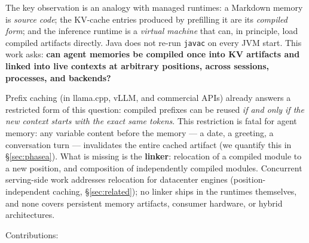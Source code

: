 \documentclass[11pt]{article}
\newcommand{\code}[1]{\texttt{#1}}
\begin{document}
The key observation is an analogy with managed runtimes: a Markdown memory is \emph{source code}; the KV-cache entries produced by prefilling it are its \emph{compiled form}; and the inference runtime is a \emph{virtual machine} that can, in principle, load compiled artifacts directly. Java does not re-run \code{javac} on every JVM start. This work asks: \textbf{can agent memories be compiled once into KV artifacts and linked into live contexts at arbitrary positions, across sessions, processes, and backends?}

Prefix caching (in llama.cpp, vLLM, and commercial APIs) already answers a restricted form of this question: compiled prefixes can be reused \emph{if and only if the new context starts with the exact same tokens}. This restriction is fatal for agent memory: any variable content before the memory --- a date, a greeting, a conversation turn --- invalidates the entire cached artifact (we quantify this in \S\ref{sec:phasea}). What is missing is the \textbf{linker}: relocation of a compiled module to a new position, and composition of independently compiled modules. Concurrent serving-side work addresses relocation for datacenter engines (position-independent caching, \S\ref{sec:related}); no linker ships in the runtimes themselves, and none covers persistent memory artifacts, consumer hardware, or hybrid architectures.

Contributions:
\end{document}
